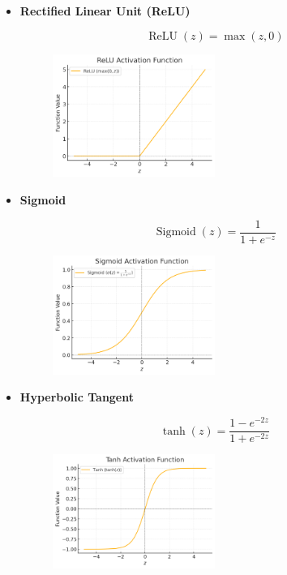 \begin{definition}
    \begin{itemize}
        \item
        \textbf{Rectified Linear Unit (ReLU)}

        $$
        \operatorname{ReLU}(z)=\max (z, 0)
        $$

        \begin{figure}[H]
            \centering
            \includegraphics[width=0.5\textwidth]{.././assets/4.3.png}
        \end{figure}
        \item
        \textbf{Sigmoid}

        $$
        \operatorname{Sigmoid}(z)=\frac{1}{1+e^{-z}}
        $$

        \begin{figure}[H]
            \centering
            \includegraphics[width=0.5\textwidth]{.././assets/4.4.png}
        \end{figure}
        \item
        \textbf{Hyperbolic Tangent}

        $$
        \tanh (z)=\frac{1-e^{-2 z}}{1+e^{-2 z}}
        $$

        \begin{figure}[H]
            \centering
            \includegraphics[width=0.5\textwidth]{.././assets/4.5.png}
        \end{figure}
    \end{itemize}
\end{definition}

